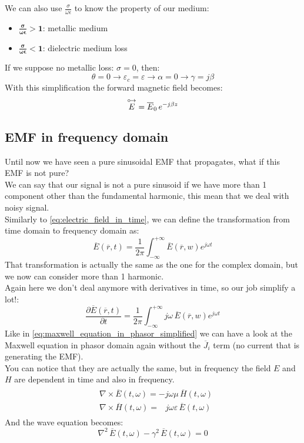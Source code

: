 We can also use $\frac{\sigma}{\omega \epsilon}$ to know the property of our medium:
\begin{itemize}
    \item $\bm{\frac{\sigma}{\omega \epsilon}> 1}$: metallic medium
    \item $\bm{\frac{\sigma}{\omega \epsilon}< 1}$: dielectric medium loss
\end{itemize}
If we suppose no metallic loss: $\sigma = 0$, then:
\begin{equation*}
    \theta=0\rightarrow\varepsilon_c=\varepsilon\rightarrow\alpha=0\rightarrow\gamma =j\beta
\end{equation*}
With this simplification the forward magnetic field becomes:
\begin{equation}
    \overset{\mathbin {{\circ \mkern-2.5mu\rightarrow}}}{E}=\overline{E}_{0}\, e^{-j\beta z}
\end{equation}
\subsection*{EMF in frequency domain}
Until now we have seen a pure sinusoidal EMF that propagates, what if this EMF is not pure?\\
We can say that our signal is not a pure sinusoid if we have more than 1 component other than the fundamental harmonic, this mean that we deal with noisy signal.\\
Similarly to \cref{eq:electric_field_in_time}, we can define the transformation from time domain to frequency domain as:
\begin{equation}
    \overline{E}(\overline{r},t)=\frac{1}{2\pi}\int_{-\infty}^{+\infty}\overline{E}(\overline{r},w)e^{j\omega t}
\end{equation}
That transformation is actually the same as the one for the complex domain, but we now can consider more than 1 harmonic.\\
Again here we don't deal anymore with derivatives in time, so our job simplify a lot!:
\begin{equation}
    \frac{\partial\overline{E}(\overline{r},t)}{\partial t}=\frac{1}{2\pi}\int_{-\infty}^{+\infty}j\omega\,\overline{E}(\overline{r},w)e^{j\omega t}
\end{equation}
Like in \cref{eq:maxwell_equation_in_phasor_simplified} we can have a look at the Maxwell equation in phasor domain again without the $\overline{J}_i$ term (no current that is generating the EMF).\\
You can notice that they are actually the same, but in frequency the field $E$ and $H$ are dependent in time and also in frequency.
\begin{align}
    \begin{split}
        &\nabla\times\overline{E}(t,\omega)=-j\omega\mu\,\overline{H}(t,\omega)\\[5pt]
        &\nabla\times\overline{H}(t,\omega)=\;\;\,j\omega \varepsilon\,\overline{E}(t,\omega)
    \end{split}
\end{align}
And the wave equation becomes:
\begin{equation}
    \nabla^2\,\overline{E}(t,\omega)-\gamma^2\,\overline{E}(t,\omega)=0
\end{equation}
